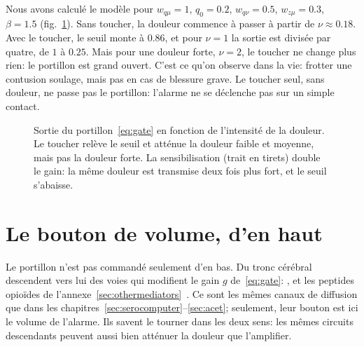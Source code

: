 Nous avons calculé le modèle pour $w_{q\mu}=1$, $q_0=0.2$, $w_{q\nu}=0.5$, $w_{z\mu}=0.3$, $\beta=1.5$ (fig.~\ref{fig:gatecurves}). Sans toucher, la douleur commence à passer à partir de $\nu\approx0.18$. Avec le toucher, le seuil monte à $0.86$, et pour $\nu=1$ la sortie est divisée par quatre, de $1$ à $0.25$. Mais pour une douleur forte, $\nu=2$, le toucher ne change plus rien: le portillon est grand ouvert. C'est ce qu'on observe dans la vie: frotter une contusion soulage, mais pas en cas de blessure grave. Le toucher seul, sans douleur, ne passe pas le portillon: l'alarme ne se déclenche pas sur un simple contact.

\begin{figure}[t]
\centering
{}
\caption{Sortie du portillon~\eqref{eq:gate} en fonction de l'intensité de la douleur. Le toucher relève le seuil et atténue la douleur faible et moyenne, mais pas la douleur forte. La sensibilisation (trait en tirets) double le gain: la même douleur est transmise deux fois plus fort, et le seuil s'abaisse.}
\label{fig:gatecurves}
\end{figure}

\section{Le bouton de volume, d'en haut}

Le portillon n'est pas commandé seulement d'en bas. Du tronc cérébral descendent vers lui des voies qui modifient le gain $g$ de~\eqref{eq:gate}: ,  et les peptides opioïdes de l'annexe~\ref{sec:othermediators}~\cite{Fields2004}. Ce sont les mêmes canaux de diffusion que dans les chapitres~\ref{sec:serocomputer}--\ref{sec:acet}; seulement, leur bouton est ici le volume de l'alarme. Ils savent le tourner dans les deux sens: les mêmes circuits descendants peuvent aussi bien atténuer la douleur que l'amplifier.

